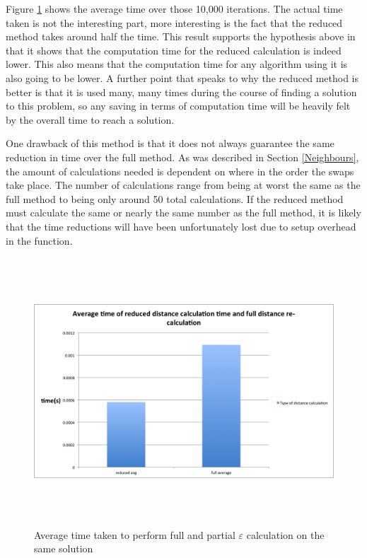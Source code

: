 \documentclass[12pt]{report}
\begin{document}
Figure \ref{f_recalcComparison} shows the average time over those 10,000 iterations. The actual time taken is not the interesting part, more interesting is the fact that the reduced method takes around half the time. This result supports the hypothesis above in that it shows that the computation time for the reduced calculation is indeed lower. This also means that the computation time for any algorithm using it is also going to be lower. A further point that speaks to why the reduced method is better is that it is used many, many times during the course of finding a solution to this problem, so any saving in terms of computation time will be heavily felt by the overall time to reach a solution.

One drawback of this method is that it does not always guarantee the same reduction in time over the full method. As was described in Section \ref{Neighbours}, the amount of calculations needed is dependent on where in the order the swaps take place. The number of calculations range from being at worst the same as the full method to being only around 50 total calculations. If the reduced method must calculate the same or nearly the same number as the full method, it is likely that the time reductions will have been unfortunately lost due to setup overhead in the function.

\begin{figure}[H]
\centering
\includegraphics[width=18cm, height=10cm]{../code/misc/reducedvsFullDistanceCalc}
\caption{Average time taken to perform full and partial $\varepsilon$ calculation on the same solution}
\label{f_recalcComparison}
\end{figure}
\end{document}
